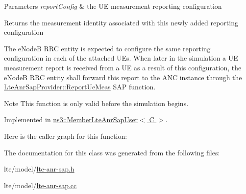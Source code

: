 \begin{DoxyParams}{Parameters}
{\em report\+Config} & the UE measurement reporting configuration \\
\hline
\end{DoxyParams}
\begin{DoxyReturn}{Returns}
the measurement identity associated with this newly added reporting configuration
\end{DoxyReturn}
The e\+NodeB R\+RC entity is expected to configure the same reporting configuration in each of the attached U\+Es. When later in the simulation a UE measurement report is received from a UE as a result of this configuration, the e\+NodeB R\+RC entity shall forward this report to the A\+NC instance through the \hyperlink{classns3_1_1LteAnrSapProvider_ac4f1114bd33d0c189e2ce2624089e587}{Lte\+Anr\+Sap\+Provider\+::\+Report\+Ue\+Meas} S\+AP function.

\begin{DoxyNote}{Note}
This function is only valid before the simulation begins. 
\end{DoxyNote}


Implemented in \hyperlink{classns3_1_1MemberLteAnrSapUser_ac2187fbcd8346d540b543c58d006acf4}{ns3\+::\+Member\+Lte\+Anr\+Sap\+User$<$ C $>$}.



Here is the caller graph for this function\+:




The documentation for this class was generated from the following files\+:\begin{DoxyCompactItemize}
\item 
lte/model/\hyperlink{lte-anr-sap_8h}{lte-\/anr-\/sap.\+h}\item 
lte/model/\hyperlink{lte-anr-sap_8cc}{lte-\/anr-\/sap.\+cc}\end{DoxyCompactItemize}

